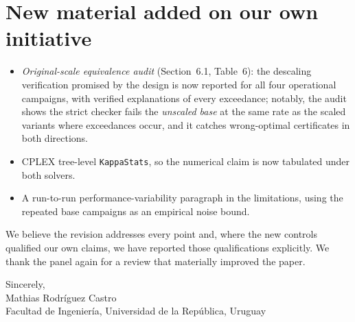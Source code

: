 \documentclass[11pt]{article}
\newcommand{\secref}[1]{Section~#1}
\begin{document}
\section*{New material added on our own initiative}
\begin{itemize}[leftmargin=1.4em]
  \item \emph{Original-scale equivalence audit} (\secref{6.1}, Table~6): the descaling
  verification promised by the design is now reported for all four operational campaigns,
  with verified explanations of every exceedance; notably, the audit shows the strict
  checker fails the \emph{unscaled base} at the same rate as the scaled variants where
  exceedances occur, and it catches wrong-optimal certificates in both directions.
  \item CPLEX tree-level \texttt{KappaStats}, so the numerical claim is now tabulated
  under both solvers.
  \item A run-to-run performance-variability paragraph in the limitations, using the
  repeated base campaigns as an empirical noise bound.
\end{itemize}

\bigskip
\noindent We believe the revision addresses every point and, where the new controls
qualified our own claims, we have reported those qualifications explicitly. We thank the
panel again for a review that materially improved the paper.

\bigskip
\noindent Sincerely,\\[0.3em]
Mathias Rodr\'iguez Castro\\
Facultad de Ingenier\'ia, Universidad de la Rep\'ublica, Uruguay
\end{document}
